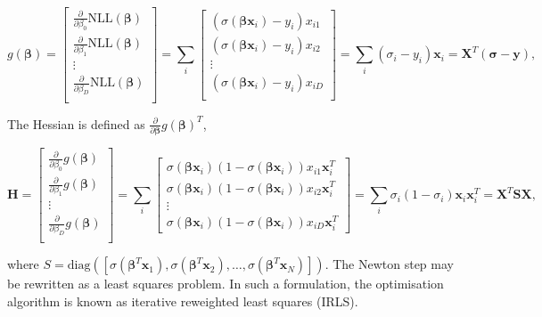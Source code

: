 \documentclass[11pt]{amsart}
\begin{document}
$$g(\boldsymbol\beta) = \begin{bmatrix}
\frac{\partial}{\partial \beta_0} \text{NLL}(\boldsymbol\beta) \\
\frac{\partial}{\partial \beta_1} \text{NLL}(\boldsymbol\beta) \\
\vdots \\
\frac{\partial}{\partial \beta_D} \text{NLL}(\boldsymbol\beta) \\
\end{bmatrix} =
\sum_i \begin{bmatrix}
(\sigma(\boldsymbol\beta\mathbf{x}_i) - y_i)x_{i1} \\
(\sigma(\boldsymbol\beta\mathbf{x}_i) - y_i)x_{i2} \\
\vdots \\
(\sigma(\boldsymbol\beta\mathbf{x}_i) - y_i)x_{iD} \\
\end{bmatrix}
= \sum_i (\sigma_i - y_i)\mathbf{x}_i = \mathbf{X}^T(\boldsymbol\sigma - \mathbf{y}),
$$

The Hessian is defined as $\frac{\partial}{\partial\mathbf{\boldsymbol\beta}}g(\boldsymbol\beta)^T$,

$$\mathbf{H} = \begin{bmatrix}
\frac{\partial}{\partial \beta_0} g(\boldsymbol\beta) \\
\frac{\partial}{\partial \beta_1} g(\boldsymbol\beta) \\
\vdots \\
\frac{\partial}{\partial \beta_D} g(\boldsymbol\beta) \\
\end{bmatrix} =
\sum_i\begin{bmatrix}
\sigma(\boldsymbol\beta\mathbf{x}_i)(1 - \sigma(\boldsymbol\beta\mathbf{x}_i))x_{i1}\mathbf{x}_i^T \\
\sigma(\boldsymbol\beta\mathbf{x}_i)(1 - \sigma(\boldsymbol\beta\mathbf{x}_i))x_{i2}\mathbf{x}_i^T \\
\vdots \\
\sigma(\boldsymbol\beta\mathbf{x}_i)(1 - \sigma(\boldsymbol\beta\mathbf{x}_i))x_{iD}\mathbf{x}_i^T
\end{bmatrix}
= \sum_i \sigma_i(1 - \sigma_i)\mathbf{x}_i\mathbf{x}_i^T = \mathbf{X}^T\mathbf{S}\mathbf{X},
$$

where $S = \text{diag}([\sigma(\boldsymbol\beta^T\mathbf{x}_1), \sigma(\boldsymbol\beta^T\mathbf{x}_2), \dots, \sigma(\boldsymbol\beta^T\mathbf{x}_N)])$. The Newton step may be rewritten as a least squares problem. In such a formulation, the optimisation algorithm is known as iterative reweighted least squares (IRLS).
\end{document}
